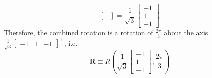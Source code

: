 \documentclass[10pt]{article}
\begin{document}
\begin{enumerate}
\begin{equation*}
\begin{bmatrix}
            \end{bmatrix} = \frac{1}{\sqrt{3}} \begin{bmatrix}
                -1 \\
                1 \\
                -1
            \end{bmatrix}
        \end{equation*}
        Therefore, the combined rotation is a rotation of $\frac{2\pi}{3}$ about the axis
        $\frac{1}{\sqrt{3}} \begin{bmatrix} -1 & 1 & -1 \end{bmatrix}^{\top}$,
        i.e.
        \begin{equation*}
            \mathbf{R} \equiv R\left(\frac{1}{\sqrt{3}} \begin{bmatrix}
                -1  \\
                1 \\
                -1
            \end{bmatrix}, \frac{2\pi}{3}\right)
        \end{equation*}


\end{enumerate}
\end{document}
